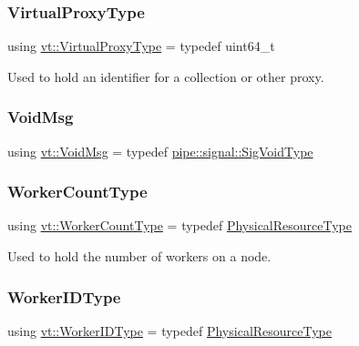 \subsubsection{\texorpdfstring{Virtual\+Proxy\+Type}{VirtualProxyType}}
{\footnotesize\ttfamily using \hyperlink{namespacevt_a1b417dd5d684f045bb58a0ede70045ac}{vt\+::\+Virtual\+Proxy\+Type} = typedef uint64\+\_\+t}



Used to hold an identifier for a collection or other proxy. 

\mbox{\label{namespacevt_ae108c204035ac2513c8d09e6971a4a31}} 
\subsubsection{\texorpdfstring{Void\+Msg}{VoidMsg}}
{\footnotesize\ttfamily using \hyperlink{namespacevt_ae108c204035ac2513c8d09e6971a4a31}{vt\+::\+Void\+Msg} = typedef \hyperlink{namespacevt_1_1pipe_1_1signal_acbe257d1ae44f20fa9fd9b6ed3057caf}{pipe\+::signal\+::\+Sig\+Void\+Type}}

\mbox{\label{namespacevt_aa93398ea48f2cb6c188512250f7cc248}} 
\subsubsection{\texorpdfstring{Worker\+Count\+Type}{WorkerCountType}}
{\footnotesize\ttfamily using \hyperlink{namespacevt_aa93398ea48f2cb6c188512250f7cc248}{vt\+::\+Worker\+Count\+Type} = typedef \hyperlink{namespacevt_a2dc36fcada816dc6d11774d650328ee9}{Physical\+Resource\+Type}}



Used to hold the number of workers on a node. 

\mbox{\label{namespacevt_a656e362091da17b9b93d0655b36e3392}} 
\subsubsection{\texorpdfstring{Worker\+I\+D\+Type}{WorkerIDType}}
{\footnotesize\ttfamily using \hyperlink{namespacevt_a656e362091da17b9b93d0655b36e3392}{vt\+::\+Worker\+I\+D\+Type} = typedef \hyperlink{namespacevt_a2dc36fcada816dc6d11774d650328ee9}{Physical\+Resource\+Type}}



